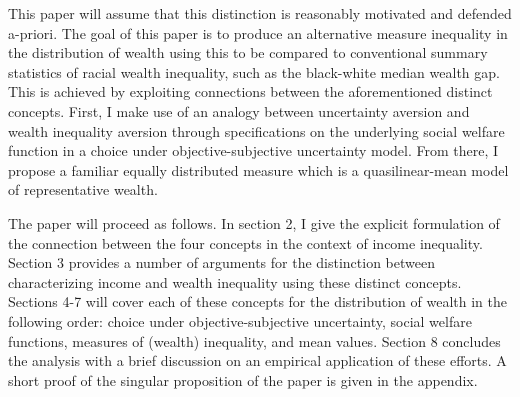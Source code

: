 \documentclass[\econtexRoot/IneqMeas]{subfiles}
\begin{document}
\par This paper will assume that this distinction is reasonably motivated and defended a-priori. The goal of this paper is to produce an alternative measure inequality in the distribution of wealth using this  to be compared to conventional summary statistics of racial wealth inequality, such as the black-white median wealth gap. This is achieved by exploiting connections between the aforementioned distinct concepts. First, I make use of an analogy between uncertainty aversion and wealth inequality aversion through specifications on the underlying social welfare function in a choice under objective-subjective uncertainty model. From there, I propose a familiar equally distributed measure which is a quasilinear-mean model of representative wealth.

\par The paper will proceed as follows. In section 2, I give the explicit formulation of the connection between the four concepts in the context of income inequality. Section 3 provides a number of arguments for the distinction between characterizing income and wealth inequality using these distinct concepts. Sections 4-7 will cover each of these concepts for the distribution of wealth in the following order: choice under objective-subjective uncertainty, social welfare functions, measures of (wealth) inequality, and mean values. Section 8 concludes the analysis with a brief discussion on an empirical application of these efforts. A short proof of the singular proposition of the paper is given in the appendix.

\onlyinsubfile{}

\end{document}
